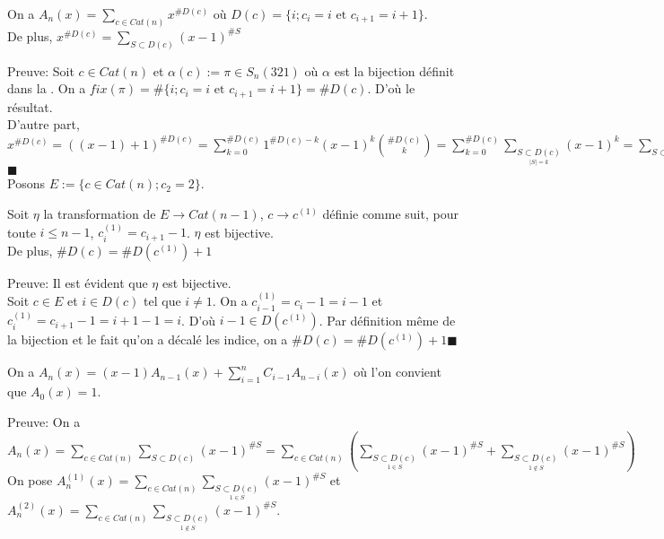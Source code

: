 \begin{proposition}
	On a $A_{n}(x)=\sum\limits_{c\in Cat(n)}x^{\#D(c)}$ où $D(c) = \{i; c_{i}=i \text{ et } c_{i+1}=i+1\}$.\vspace{5pt}\\
	De plus, $x^{\# D(c)} = \sum\limits_{S\subset D(c)}(x-1)^{\#S}$
\end{proposition}
Preuve: Soit $c\in Cat(n)$ et $\alpha(c):=\pi \in S_{n}(321)$ où $\alpha$ est la bijection définit dans la . On a $fix(\pi) = \# \{i; c_{i}=i \text{ et } c_{i+1}=i+1\}=\#D(c)$. D'où le résultat.\vspace{5pt}\\
D'autre part,\\ $x^{\#D(c)}= ((x-1)+1)^{\#D(c)}= \sum\limits_{k=0}^{\#D(c)} 1^{\#D(c)-k}(x-1)^{k}\binom{ \#D(c)}{ k}= \sum\limits_{k=0}^{\#D(c)}\sum\limits_{\underset{|S|=k}{S\subset D(c)}}(x-1)^{k} = \sum\limits_{S\subset D(c)}(x-1)^{\#S}$\text{ }$\blacksquare$\vspace{10pt}\\
Posons $E:=\{c \in Cat(n); c_{2}=2\}$.
\begin{proposition}
	Soit $\eta$ la transformation de $E \longrightarrow Cat(n-1)$, $c\longrightarrow c^{(1)}$ définie comme suit, pour toute $i\leq n-1$, $c_{i}^{(1)}=c_{i+1}-1$. $\eta$ est bijective.\vspace{5pt}\\
	De plus, $\#D(c) = \#D(c^{(1)}) +1$
\end{proposition}
Preuve: Il est évident que $\eta$ est bijective.\\
Soit $c\in E$ et $i\in D(c)$ tel que $i\neq 1$. On a $c^{(1)}_{i-1}=c_{i}-1=i-1$ et $c^{(1)}_{i}=c_{i+1}-1=i+1-1=i$. D'où $i-1\in D(c^{(1)})$. Par définition même de la bijection et le fait qu'on a décalé les indice, on a $\#D(c) = \#D(c^{(1)}) +1$\hspace{5pt}$\blacksquare$
\begin{proposition} \label{prop225}
	On a $A_{n}(x)=(x-1)A_{n-1}(x)+ \sum\limits_{i=1}^{n}C_{i-1}A_{n-i}(x)$ où l'on convient que $A_{0}(x)=1$.
\end{proposition}
Preuve: On a $A_{n}(x)= \sum\limits_{c\in Cat(n)}\sum\limits_{S\subset D(c)}(x-1)^{\# S}=\sum\limits_{c\in Cat(n)}\left( \sum\limits_{\underset{1\in S}{S\subset D(c)}}(x-1)^{\#S} + \sum \limits_{\underset{1\notin S}{S\subset D(c)}} (x-1)^{\#S} \right)$\vspace{5pt}\\
On pose $A_{n}^{(1)}(x)=\sum\limits_{c\in Cat(n)}\sum\limits_{\underset{1\in S}{S\subset D(c)}}(x-1)^{{\#S}}$ et $A_{n}^{(2)}(x)=\sum\limits_{c\in Cat(n)}\sum\limits_{\underset{1\notin S}{S\subset D(c)}}(x-1)^{{\#S}}$. \\
